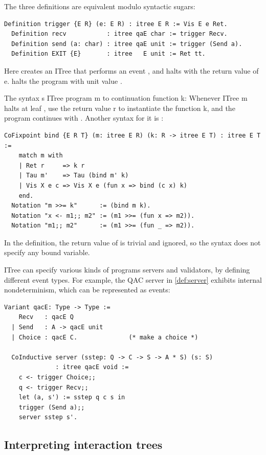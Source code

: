 The three  definitions are equivalent modulo syntactic sugars:
\begin{lstlisting}[style=customcoq]
  Definition trigger {E R} (e: E R) : itree E R := Vis E e Ret.
  Definition recv           : itree qaE char := trigger Recv.
  Definition send (a: char) : itree qaE unit := trigger (Send a).
  Definition EXIT {E}       : itree   E unit := Ret tt.
\end{lstlisting}

Here  creates an ITree that performs an event ,
and halts with the return value of \ilc e.   halts the program with
unit value .

The  syntax s ITree program \ilc m to continuation
function \ilc k: Whenever ITree \ilc m halts at leaf , use the
return value \ilc r to instantiate the function \ilc k, and the program
continues with .  Another syntax for it is :
\begin{lstlisting}[style=customcoq]
  CoFixpoint bind {E R T} (m: itree E R) (k: R -> itree E T) : itree E T :=
    match m with
    | Ret r     => k r
    | Tau m'    => Tau (bind m' k)
    | Vis X e c => Vis X e (fun x => bind (c x) k)
    end.
  Notation "m >>= k"      := (bind m k).
  Notation "x <- m1;; m2" := (m1 >>= (fun x => m2)).
  Notation "m1;; m2"      := (m1 >>= (fun _ => m2)).
\end{lstlisting}

In the  definition, the return value of  is trivial and
ignored, so the syntax  does not specify any bound
variable.

ITree can specify various kinds of programs servers and validators, by defining
different event types.  For example, the QAC server in \autoref{def:server}
exhibits internal nondeterminism, which can be represented as 
events:
\begin{lstlisting}[style=customcoq]
  Variant qacE: Type -> Type :=
    Recv   : qacE Q
  | Send   : A -> qacE unit
  | Choice : qacE C.              (* make a choice *)
  
  CoInductive server (sstep: Q -> C -> S -> A * S) (s: S)
              : itree qacE void :=
    c <- trigger Choice;;
    q <- trigger Recv;;
    let (a, s') := sstep q c s in
    trigger (Send a);;
    server sstep s'.
\end{lstlisting}

\subsection{Interpreting interaction trees}

